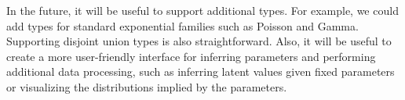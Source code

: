 \documentclass{article}
\begin{document}
  In the future, it will be useful to support additional types.  For example, we could add types for standard exponential families such as Poisson and Gamma.  Supporting disjoint union types is also straightforward.  Also, it will be useful to create a more user-friendly interface for inferring parameters and performing additional data processing, such as inferring latent values given fixed parameters or visualizing the distributions implied by the parameters.

{}

\end{document}
